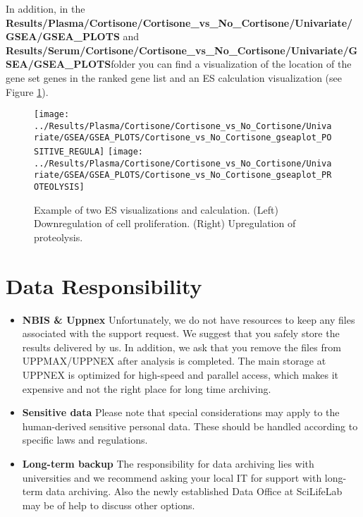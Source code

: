 \documentclass[
]{book}
\providecommand{\tightlist}{%
  \setlength{\itemsep}{0pt}\setlength{\parskip}{0pt}}
\begin{document}
In addition, in the \textbf{Results/Plasma/Cortisone/Cortisone\_vs\_No\_Cortisone/Univariate/GSEA/GSEA\_PLOTS} and \textbf{Results/Serum/Cortisone/Cortisone\_vs\_No\_Cortisone/Univariate/GSEA/GSEA\_PLOTS}folder you can find a visualization of the location of the gene set genes in the ranked gene list and an ES calculation visualization (see Figure \ref{fig:gseaNesCort}).

\begin{figure}

{\centering \texttt{[image: ../Results/Plasma/Cortisone/Cortisone\_vs\_No\_Cortisone/Univariate/GSEA/GSEA\_PLOTS/Cortisone\_vs\_No\_Cortisone\_gseaplot\_POSITIVE\_REGULA]} \texttt{[image: ../Results/Plasma/Cortisone/Cortisone\_vs\_No\_Cortisone/Univariate/GSEA/GSEA\_PLOTS/Cortisone\_vs\_No\_Cortisone\_gseaplot\_PROTEOLYSIS]} 

}

\caption{Example of two ES visualizations and calculation. (Left) Downregulation of cell proliferation. (Right) Upregulation of proteolysis.}\label{fig:gseaNesCort}
\end{figure}

\hypertarget{data-responsibility}{%
\chapter{Data Responsibility}\label{data-responsibility}}

\begin{itemize}
\tightlist
\item
  \textbf{NBIS \& Uppnex} Unfortunately, we do not have resources to keep any files associated with the support request. We suggest that you safely store the results delivered by us. In addition, we ask that you remove the files from UPPMAX/UPPNEX after analysis is completed. The main storage at UPPNEX is optimized for high-speed and parallel access, which makes it expensive and not the right place for long time archiving.
\item
  \textbf{Sensitive data} Please note that special considerations may apply to the human-derived sensitive personal data. These should be handled according to specific laws and regulations.
\item
  \textbf{Long-term backup} The responsibility for data archiving lies with universities and we recommend asking your local IT for support with long-term data archiving. Also the newly established Data Office at SciLifeLab may be of help to discuss other options.
\end{itemize}
\end{document}
